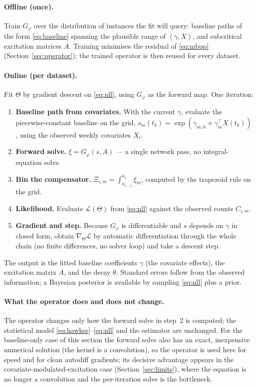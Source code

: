 \documentclass[11pt]{article}
\begin{document}
\paragraph{Offline (once).} Train $G_\varphi$ over the distribution of instances the fit
will query: baseline paths of the form \eqref{eq:baseline} spanning the plausible range
of $(\gamma,X)$, and subcritical excitation matrices $A$. Training minimises the
residual of \eqref{eq:mbpp} (Section~\ref{sec:operator}); the trained operator is then
reused for every dataset.

\paragraph{Online (per dataset).} Fit $\Theta$ by gradient descent on
\eqref{eq:nll}, using $G_\varphi$ as the forward map. One iteration:
\begin{enumerate}[leftmargin=1.7em,itemsep=2pt]
\item \textbf{Baseline path from covariates.} With the current $\gamma$, evaluate the
piecewise-constant baseline on the grid, $s_m(t_k)=\exp(\gamma_{m,0}+\gamma_m^\top
X(t_k))$, using the observed weekly covariates $X_i$.
\item \textbf{Forward solve.} $\xi = G_\varphi(s, A)$ --- a single network pass, no
integral-equation solve.
\item \textbf{Bin the compensator.} $\Xi_{i,m}=\int_{a_{i-1}}^{a_i}\xi_m$, computed by
the trapezoid rule on the grid.
\item \textbf{Likelihood.} Evaluate $\mathcal{L}(\Theta)$ from \eqref{eq:nll} against the
observed counts $C_{i,m}$.
\item \textbf{Gradient and step.} Because $G_\varphi$ is differentiable and $s$ depends
on $\gamma$ in closed form, obtain $\nabla_\Theta\mathcal{L}$ by automatic
differentiation through the whole chain (no finite differences, no solver loop) and take
a descent step.
\end{enumerate}
The output is the fitted baseline coefficients $\gamma$ (the covariate effects), the
excitation matrix $A$, and the decay $\theta$. Standard errors follow from the observed
information; a Bayesian posterior is available by sampling \eqref{eq:nll} plus a prior.

\paragraph{What the operator does and does not change.} The operator changes only how the
forward solve in step~2 is computed; the statistical model \eqref{eq:hawkes}--\eqref{eq:nll}
and the estimator are unchanged. For the baseline-only case of this section the forward
solve also has an exact, inexpensive numerical solution (the kernel is a convolution),
so the operator is used here for speed and for clean autodiff gradients; its decisive
advantage appears in the covariate-modulated-excitation case (Section~\ref{sec:limits}),
where the equation is no longer a convolution and the per-iteration solve is the
bottleneck.
\end{document}

